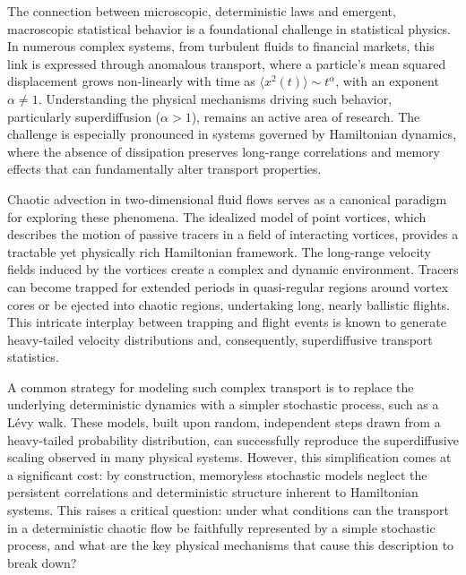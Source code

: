 \documentclass[]{article}
\begin{document}
The connection between microscopic, deterministic laws and emergent, macroscopic statistical behavior is a foundational challenge in statistical physics. In numerous complex systems, from turbulent fluids to financial markets, this link is expressed through anomalous transport, where a particle's mean squared displacement grows non-linearly with time as $\langle x^2(t) \rangle \sim t^\alpha$, with an exponent $\alpha \neq 1$. Understanding the physical mechanisms driving such behavior, particularly superdiffusion ($\alpha > 1$), remains an active area of research. The challenge is especially pronounced in systems governed by Hamiltonian dynamics, where the absence of dissipation preserves long-range correlations and memory effects that can fundamentally alter transport properties.

Chaotic advection in two-dimensional fluid flows serves as a canonical paradigm for exploring these phenomena. The idealized model of point vortices, which describes the motion of passive tracers in a field of interacting vortices, provides a tractable yet physically rich Hamiltonian framework. The long-range velocity fields induced by the vortices create a complex and dynamic environment. Tracers can become trapped for extended periods in quasi-regular regions around vortex cores or be ejected into chaotic regions, undertaking long, nearly ballistic flights. This intricate interplay between trapping and flight events is known to generate heavy-tailed velocity distributions and, consequently, superdiffusive transport statistics.

A common strategy for modeling such complex transport is to replace the underlying deterministic dynamics with a simpler stochastic process, such as a Lévy walk. These models, built upon random, independent steps drawn from a heavy-tailed probability distribution, can successfully reproduce the superdiffusive scaling observed in many physical systems. However, this simplification comes at a significant cost: by construction, memoryless stochastic models neglect the persistent correlations and deterministic structure inherent to Hamiltonian systems. This raises a critical question: under what conditions can the transport in a deterministic chaotic flow be faithfully represented by a simple stochastic process, and what are the key physical mechanisms that cause this description to break down?
\end{document}
